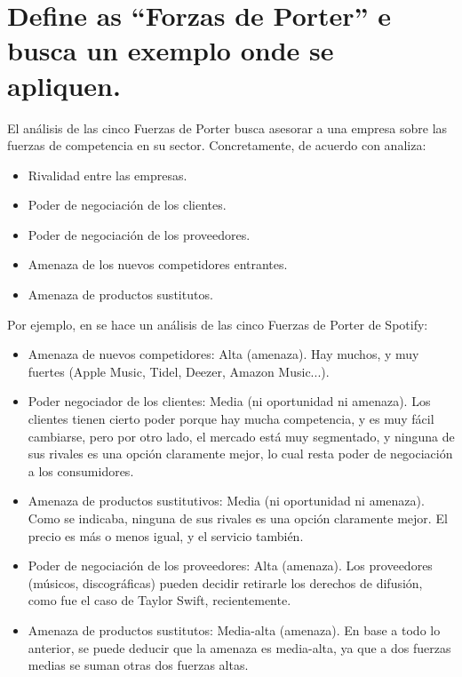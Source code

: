 \documentclass[a4paper]{article}
\begin{document}
\section{Define as ``Forzas de Porter'' e busca un exemplo onde se apliquen.}

El análisis de las cinco Fuerzas de Porter busca asesorar a una empresa sobre las fuerzas de competencia en su sector. Concretamente, de acuerdo con \cite{RefWorks:doc:602fb6588f0850dd1efa1bcd} analiza:

\begin{itemize}
    \item Rivalidad entre las empresas.
    \item Poder de negociación de los clientes.
    \item Poder de negociación de los proveedores.
    \item Amenaza de los nuevos competidores entrantes.
    \item Amenaza de productos sustitutos.
\end{itemize}

Por ejemplo, en \cite{RefWorks:doc:602fb9d78f087d63396a4d34} se hace un análisis de las cinco Fuerzas de Porter de Spotify:

\begin{itemize}
    \item Amenaza de nuevos competidores: Alta (amenaza). Hay muchos, y muy fuertes (Apple Music, Tidel, Deezer, Amazon Music...).
    \item Poder negociador de los clientes: Media (ni oportunidad ni amenaza). Los clientes tienen cierto poder porque hay mucha competencia, y es muy fácil cambiarse, pero por otro lado, el mercado está muy segmentado, y ninguna de sus rivales es una opción claramente mejor, lo cual resta poder de negociación a los consumidores.
    \item Amenaza de productos sustitutivos: Media (ni oportunidad ni amenaza). Como se indicaba, ninguna de sus rivales es una opción claramente mejor. El precio es más o menos igual, y el servicio también.
    \item Poder de negociación de los proveedores: Alta (amenaza). Los proveedores (músicos, discográficas) pueden decidir retirarle los derechos de difusión, como fue el caso de Taylor Swift, recientemente.
    \item Amenaza de productos sustitutos: Media-alta (amenaza). En base a todo lo anterior, se puede deducir que la amenaza es media-alta, ya que a dos fuerzas medias se suman otras dos fuerzas altas.
\end{itemize}
\end{document}

